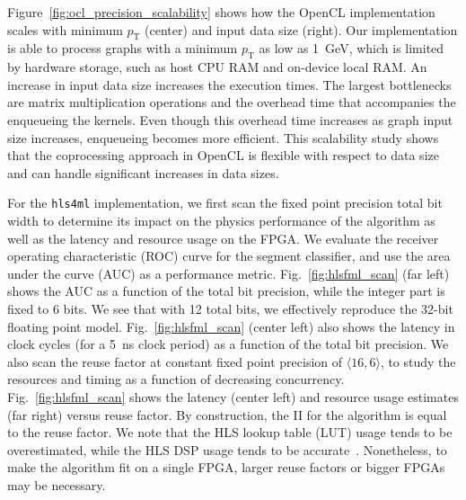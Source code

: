 \documentclass{article}
\newcommand{\hlsfml}{\texttt{hls4ml}\xspace}
\newcommand{\pt}{\ensuremath{p_{\mathrm{T}}}\xspace}
\begin{document}
Figure~\ref{fig:ocl_precision_scalability} shows how the OpenCL implementation scales with minimum $\pt$ (center) and input data size (right).
Our implementation is able to process graphs with a minimum $\pt$ as low as 1~GeV, which is limited by hardware storage, such as host CPU RAM and on-device local RAM. 
An increase in input data size increases the execution times. 
The largest bottlenecks are matrix multiplication operations and the overhead time that accompanies the enqueueing the kernels. %
Even though this overhead time increases as graph input size increases, enqueueing becomes more efficient. %
This scalability study shows that the coprocessing approach in OpenCL is flexible with respect to data size and can handle significant increases in data sizes.

For the \hlsfml implementation, we first scan the fixed point precision total bit width to determine its impact on the physics performance of the algorithm as well as the latency and resource usage on the FPGA. 
We evaluate the receiver operating characteristic (ROC) curve for the segment classifier, and use the area under the curve (AUC) as a performance metric. 
Fig.~\ref{fig:hlsfml_scan} (far left) shows the AUC as a function of the total bit precision, while the integer part is fixed to 6 bits.
We see that with 12 total bits, we effectively reproduce the 32-bit floating point model.
Fig.~\ref{fig:hlsfml_scan} (center left) also shows the latency in clock cycles (for a 5~ns clock period) as a function of the total bit precision.
We also scan the reuse factor at constant fixed point precision of $\langle16,6\rangle$, to study the resources and timing as a function of decreasing concurrency.
Fig.~\ref{fig:hlsfml_scan} shows the latency (center left) and resource usage estimates (far right) versus reuse factor.
By construction, the II for the algorithm is equal to the reuse factor.
We note that the HLS lookup table (LUT) usage tends to be overestimated, while the HLS DSP usage tends to be accurate~\cite{Duarte:2018ite,Iiyama:2020wap,DiGuglielmo:2020eqx}.
Nonetheless, to make the algorithm fit on a single FPGA, larger reuse factors or bigger FPGAs may be necessary.
\end{document}
